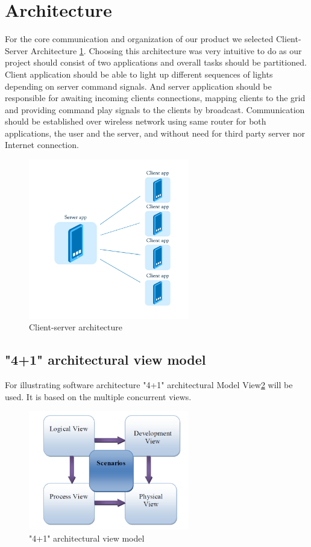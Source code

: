 \section{Architecture}

For the core communication and organization of our product we selected Client-Server Architecture \ref{fig:sprint1_arhitecture}.
Choosing this architecture was very intuitive to do as our project should consist of two applications and overall tasks should be partitioned. 
Client application should be able to light up different sequences of lights depending on server command signals.
And server application should be responsible for awaiting incoming clients connections, mapping clients to the grid and providing command play signals to the clients by broadcast.
Communication should be established over wireless network using same router for both applications, the user and the server, and without need for third party server nor Internet connection. 

\begin{figure}[!h]
	\centering
		\includegraphics[width=7cm]{sprint1/arhitecture.png}
	\caption{Client-server architecture}
	\label{fig:sprint1_arhitecture}
\end{figure}

\subsection{"4+1" architectural view model}
For illustrating software architecture "4+1" architectural Model View\ref{fig:4+1 } will be used. It is based on the multiple concurrent views.

\begin{figure}[!ht]
	\centering
		\includegraphics[width=7cm]{sprint1/4+1.png}
	\caption{"4+1" architectural view model}
	\label{fig:4+1 }

\end{figure}

